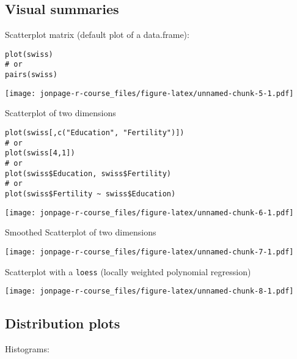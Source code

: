 \documentclass[]{book}
\newenvironment{Shaded}{\begin{snugshade}}{\end{snugshade}}
\newcommand{\KeywordTok}[1]{\textcolor[rgb]{0.13,0.29,0.53}{\textbf{{#1}}}}
\newcommand{\StringTok}[1]{\textcolor[rgb]{0.31,0.60,0.02}{{#1}}}
\newcommand{\NormalTok}[1]{{#1}}
\theoremstyle{definition}
\theoremstyle{definition}
\theoremstyle{remark}
\begin{document}
\subsection{Visual summaries}\label{visual-summaries}

Scatterplot matrix (default plot of a data.frame):

\begin{verbatim}
plot(swiss)
# or
pairs(swiss)
\end{verbatim}

\texttt{[image: jonpage-r-course\_files/figure-latex/unnamed-chunk-5-1.pdf]}

Scatterplot of two dimensions

\begin{verbatim}
plot(swiss[,c("Education", "Fertility")])
# or
plot(swiss[4,1])
# or
plot(swiss$Education, swiss$Fertility)
# or
plot(swiss$Fertility ~ swiss$Education)
\end{verbatim}

\texttt{[image: jonpage-r-course\_files/figure-latex/unnamed-chunk-6-1.pdf]}

Smoothed Scatterplot of two dimensions

\begin{Shaded}
\end{Shaded}

\texttt{[image: jonpage-r-course\_files/figure-latex/unnamed-chunk-7-1.pdf]}

Scatterplot with a \texttt{loess} (locally weighted polynomial
regression)

\begin{Shaded}
\end{Shaded}

\texttt{[image: jonpage-r-course\_files/figure-latex/unnamed-chunk-8-1.pdf]}

\subsection{Distribution plots}\label{distribution-plots}

Histograms:
\end{document}
